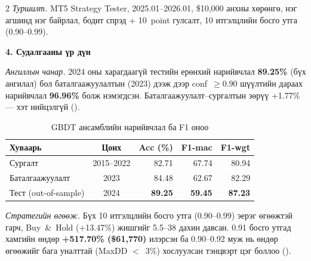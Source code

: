 \begin{multicols*}{2}
\emph{Туршилт.} MT5 Strategy Tester, 2025.01--2026.01, \$10{,}000 анхны хөрөнгө, нэг агшинд нэг байрлал, бодит спрэд + 10~point гулсалт, 10 итгэлцлийн босго утга (0.90--0.99).

\noindent\textbf{4. Судалгааны үр дүн}

\emph{Ангиллын чанар.} 2024 оны харагдаагүй тестийн ерөнхий нарийвчлал \textbf{89.25\%} (бүх ангилал) бол баталгаажуулалтын (2023) дээж дээр conf~$\geq 0.90$ шүүлтийн дараах нарийвчлал \textbf{96.96\%} болж нэмэгдсэн. Баталгаажуулалт--сургалтын зөрүү +1.77\% — хэт нийцэлгүй ().

\begin{table}[H]
\centering
\caption{GBDT ансамблийн нарийвчлал ба F1 оноо}
\label{tab:tov_model_accuracy}
\scriptsize
\renewcommand{\arraystretch}{1.15}
\setlength{\tabcolsep}{3pt}
\begin{tabular}{|l|c|r|r|r|}
\hline
Хуваарь & Цонх & Acc (\%) & F1-mac & F1-wgt \\ \hline
Сургалт            & 2015--2022 & 82.71 & 67.74 & 80.94 \\ \hline
Баталгаажуулалт    & 2023       & 84.48 & 62.67 & 82.29 \\ \hline
Тест (out-of-sample) & 2024     & \textbf{89.25} & \textbf{59.45} & \textbf{87.23} \\ \hline
\end{tabular}
\end{table}

\emph{Стратегийн өгөөж.} Бүх 10 итгэлцлийн босго утга (0.90--0.99) эерэг өгөөжтэй гарч, Buy~\&~Hold (+13.47\%) жишгийг 5.5--38 дахин давсан. 0.91 босго утгад хамгийн өндөр \textbf{+517.70\% (\$61{,}770)} илэрсэн ба 0.90--0.92 муж нь өндөр өгөөжийг бага уналттай (MaxDD $<$~3\%) хослуулсан тэнцвэрт цэг боллоо ().


\end{multicols*}
